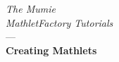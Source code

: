 \documentclass[a4paper,12pt]{article}
\begin{document}
\begin{titlepage}
\begin{center}

\vspace*{1cm}

\Large{\textit{The Mumie\\MathletFactory Tutorials}}\\[1cm] ---\\[1cm]
\huge{\textbf{Creating Mathlets}}\\[14cm]

\end{center}
\end{titlepage}

\newpage

\tableofcontents 

\newpage



\end{document}
